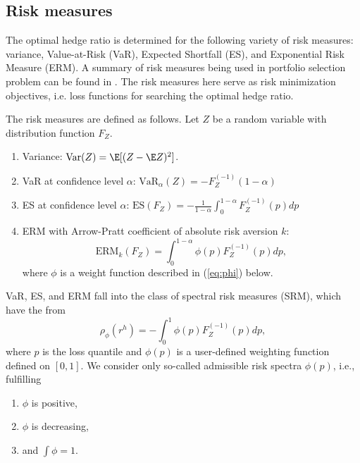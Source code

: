 \subsection{Risk measures}\label{subsec:spectral-risk-measures}
The optimal hedge ratio is determined for the following variety of risk measures: variance, Value-at-Risk (VaR), Expected Shortfall (ES), and Exponential Risk Measure (ERM).
A summary of risk measures being used in portfolio selection problem
can be found in \citet{hardle2008applied}. 
The risk measures here serve as risk minimization objectives, i.e. loss functions for searching the optimal hedge ratio. 

The risk measures are defined as follows.
Let $Z$ be a random
variable with distribution function $F_Z$.
\begin{enumerate}
\item Variance: $\text{Var}(Z) = \E[(Z-\E Z)^2]$. 
\item VaR at confidence level $\alpha$: $\text{VaR}_\alpha(Z) = -F_{Z}^{(-1)}(1-\alpha)$
\item ES at confidence level $\alpha$: $\text{ES}(F_Z) = -\frac{1}{1-\alpha}\int_0^{1-\alpha}F_Z^{(-1)}(p)dp$
\item ERM with Arrow-Pratt coefficient of absolute risk
  aversion $k$:
  \begin{equation*}
    \text{ERM}_k(F_Z) = \int_0^{1-\alpha}\phi(p) F_Z^{(-1)}(p)dp,
  \end{equation*}
  where $\phi$ is a weight function described in (\ref{eq:phi}) below.
\end{enumerate}

VaR, ES, and ERM fall into the class of spectral risk measures (SRM),
which have the from \citep{Acerbi2002}%
\begin{equation*}
  \rho_\phi(r^h) = - \int_0^1 \phi(p) F_{Z}^{(-1)}(p)d p,
\end{equation*}
where $p$ is the loss quantile and $\phi(p)$ is a user-defined
weighting function defined on $[0,1]$.
We consider only so-called admissible risk spectra $\phi(p)$, i.e.,
fulfilling %
\begin{enumerate}[label=(\roman*)]
\item $\phi$ is positive,
\item $\phi$ is decreasing,
\item and $\int\phi=1$. 
\end{enumerate}

